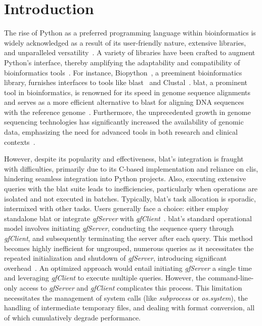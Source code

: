 \documentclass[10pt,letterpaper]{article}
\begin{document}
\linenumbers

\section*{Introduction}
The rise of Python as a preferred programming language within bioinformatics is widely acknowledged as a result of its user-friendly nature, extensive libraries, and unparalleled versatility~\cite{perkel2015programming}.
A variety of libraries have been crafted to augment Python's interface, thereby amplifying the adaptability and compatibility of bioinformatics tools~\cite{putri2022analysing, cock2009biopython}.
For instance, Biopython~\cite{cock2009biopython}, a preeminent bioinformatics library, furnishes interfaces to tools like \gls{blast}~\cite{altschul1990basic} and Clustal~\cite{higgins1988clustal}.
\gls{blat}, a prominent tool in bioinformatics, is renowned for its speed in genome sequence alignments and serves as a more efficient alternative to \gls{blast} for aligning DNA sequences with the reference genome~\cite{kent2002blat}.
Furthermore, the unprecedented growth in genome sequencing technologies has significantly increased the availability of genomic data, emphasizing the need for advanced tools in both research and clinical contexts~\cite{mardis2008next,marx2023method}.

However, despite its popularity and effectiveness, \gls{blat}'s integration is fraught with difficulties, primarily due to its C-based implementation and reliance on \glspl{cli}, hindering seamless integration into Python projects.
Also, executing extensive queries with the \gls{blat} suite leads to inefficiencies, particularly when operations are isolated and not executed in batches.
Typically, \gls{blat}'s task allocation is sporadic, intermixed with other tasks.
Users generally face a choice: either employ standalone \gls{blat} or integrate \emph{gfServer} with \emph{gfClient}~\cite{altschul1990basic}.
\gls{blat}'s standard operational model involves initiating \emph{gfServer}, conducting the sequence query through \emph{gfClient}, and subsequently terminating the server after each query.
This method becomes highly inefficient for ungrouped, numerous queries as it necessitates the repeated initialization and shutdown of \emph{gfServer}, introducing significant overhead~\cite{kent2002blat}.
An optimized approach would entail initiating \emph{gfServer} a single time and leveraging \emph{gfClient} to execute multiple queries.
However, the command-line-only access to \emph{gfServer} and \emph{gfClient} complicates this process.
This limitation necessitates the management of system calls (like \emph{subprocess} or \emph{os.system}), the handling of intermediate temporary files, and dealing with format conversion, all of which cumulatively degrade performance.
\end{document}
